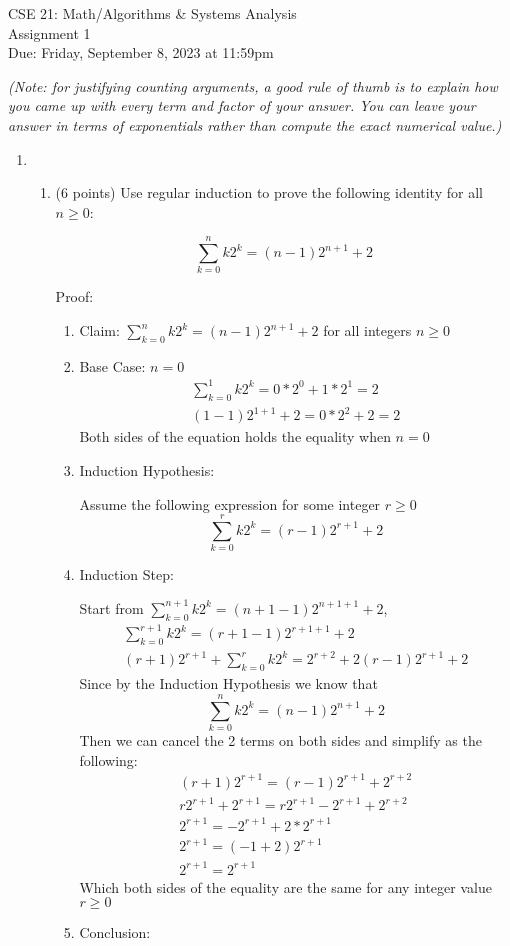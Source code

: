 \documentclass[10pt,letterpaper,unboxed,cm]{article}
\begin{document}
\begin{center}
{\LARGE CSE 21: Math/Algorithms \& Systems Analysis}\\
{\Large Assignment 1}\\
{\large Due: Friday, September 8, 2023 at 11:59pm}
\end{center}
\emph{(Note: for justifying counting arguments, a good rule of thumb is to explain how you came up with every term and factor of your answer. You can leave
your answer in terms of exponentials rather than compute the exact numerical value.)}

\begin{enumerate}
\item
\begin{enumerate}
\item (6 points)
Use regular induction to prove the following identity for all $n\geq 0$:

$$\sum_{k=0}^n k2^k = (n-1)2^{n+1} + 2$$

Proof:
\begin{enumerate}
    \item Claim: $\sum_{k=0}^{n} k2^k = (n-1)2^{n+1} + 2$ for all integers $n \geq 0$
    \item Base Case: $n=0$
    \begin{align*}
        \sum_{k=0}^{1} k2^k = 0*2^0 + 1*2^1 = 2\\
        (1 - 1)2^{1+1} + 2 = 0*2^2 + 2 = 2
    \end{align*}
    Both sides of the equation holds the equality when $n = 0$
    \item Induction Hypothesis:
    
    
    Assume the following expression for some integer $r \geq 0$
    $$
    \sum_{k = 0}^{r} k2^k = (r-1)2^{r+1} + 2
    $$
    \item Induction Step:

    
    Start from $\sum_{k=0}^{n+1}k2^k = (n+1-1)2^{n+1+1}+2$,
    \begin{align*}
        \sum_{k=0}^{r+1}k2^k = (r+1-1)2^{r+1+1}+2 \\
        (r+1)2^{r+1} + \sum_{k=0}^r k2^k = 2^{r+2} + 2(r-1)2^{r+1} + 2
    \end{align*}
    Since by the Induction Hypothesis we know that
    $$\sum_{k=0}^{n}k2^k = (n-1)2^{n+1}+2$$
    Then we can cancel the 2 terms on both sides and simplify as the following:
    \begin{align*}
        (r+1)2^{r+1} = (r-1)2^{r+1}+2^{r+2} \\
        r2^{r+1} + 2^{r+1} = r2^{r+1} - 2^{r+1} + 2^{r+2} \\
        2^{r+1} = -2^{r+1}+2*2^{r+1} \\
        2^{r+1} = (-1 + 2)2^{r+1} \\
        2^{r+1} = 2^{r+1}
    \end{align*}
    Which both sides of the equality are the same for any integer value $r \geq 0$
    \item Conclusion:


\end{enumerate}
\end{enumerate}
\end{enumerate}
\end{document}
